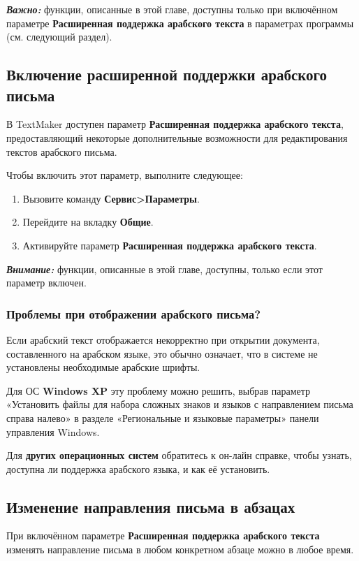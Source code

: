 ﻿\documentclass[a4paper,10pt]{article}
\begin{document}
 \begin{mdframed}[backgroundcolor=blue!10]
\textbf{\textit{Важно:}} функции, описанные в этой главе, доступны только при включённом параметре \textbf{Расширенная поддержка арабского текста} в параметрах программы (см. следующий раздел).
\end{mdframed}
 
 \subsection{Включение расширенной поддержки арабского письма}
 В TextMaker доступен параметр \textbf{Расширенная поддержка арабского текста}, предоставляющий некоторые дополнительные возможности для редактирования текстов арабского письма.
 
 Чтобы включить этот параметр, выполните следующее:
 \begin{enumerate}
  \item Вызовите команду \textbf{Сервис>Параметры}.
  \item Перейдите на вкладку \textbf{Общие}.
  \item Активируйте параметр \textbf{Расширенная поддержка арабского текста}.
 \end{enumerate}

 \begin{mdframed}[backgroundcolor=blue!10]
\textbf{\textit{Внимание:}} функции, описанные в этой главе, доступны, только если этот параметр включен.
\end{mdframed}
 
 \subsubsection{Проблемы при отображении арабского письма?}
 Если арабский текст отображается некорректно при открытии документа, составленного на арабском языке, это обычно означает, что в системе не установлены необходимые арабские шрифты.
 
 Для ОС \textbf{Windows XP} эту проблему можно решить, выбрав параметр «Установить файлы для набора сложных знаков и языков с направлением письма справа налево» в разделе «Региональные и языковые параметры» панели управления Windows.
 
 Для \textbf{других операционных систем} обратитесь к он-лайн справке, чтобы узнать, доступна ли поддержка арабского языка, и как её установить.
 
 \subsection{Изменение направления письма в абзацах}
 При включённом параметре \textbf{Расширенная поддержка арабского текста} изменять направление письма в любом конкретном абзаце можно в любое время.
 
\end{document}
